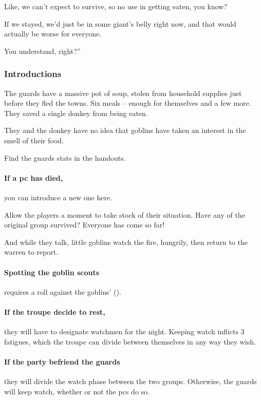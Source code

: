 \begin{multicols}{2}
\begin{speechtext}
  Like, we can't expect to survive, so no use in getting eaten, you know?

  If we stayed, we'd just be in some giant's belly right now, and that would actually be worse for everyone.

  You understand, right?''
\end{speechtext}

\subsubsection{Introductions}

The \glspl{guard} have a massive pot of soup, stolen from household supplies just before they fled the towns.
Six meals -- enough for themselves and a few more.
They saved a single donkey from being eaten.


They and the donkey have no idea that goblins have taken an interest in the smell of their food.

Find the \glspl{guard} stats in the handouts.

\paragraph{If a \gls{pc} has died,}
you can introduce a new one here.

Allow the players a moment to take stock of their situation.
Have any of the original group survived?
Everyone has come so far!

And while they talk, little goblins watch the fire, hungrily, then return to the warren to report.


\paragraph{Spotting the goblin scouts}
requires a  roll against the goblins'  (\tn).

\paragraph{If the troupe decide to rest,}
they will have to designate watchmen for the night.
Keeping watch inflicts 3 \glspl{fatigue}, which the troupe can divide between themselves in any way they wish.

\paragraph{If the party befriend the \glspl{guard}}
they will divide the watch phase between the two groups.
Otherwise, the \glspl{guard} will keep watch, whether or not the \glspl{pc} do so.


\end{multicols}
